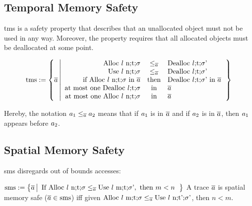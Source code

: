 \documentclass[utf8,acmsmall,review,screen,dvipsnames]{acmart}
\begin{document}
\subsection{Temporal Memory Safety}

\gls{tms} is a safety property that describes that an unallocated object must not be used in any way.
Moreover, the property requires that all allocated objects must be deallocated at some point.

\begin{definition}\label{def:trace:tmsdef}
  $$
  \tmssafe:=\left\{\trace \left| \begin{array}{rcl}
                              \ev{Alloc\ \loc\ n;\sandboxtag;\securitytag}&\le_{\trace}&\ev{Dealloc\ \loc;\sandboxtag;\securitytag'} \\
                              \ev{Use\ \loc\ n;\sandboxtag;\securitytag}&\le_{\trace}&\ev{Dealloc\ \loc;\sandboxtag;\securitytag'} \\
                              \text{if }\ev{Alloc\ \loc\ n;\sandboxtag;\securitytag}\text{ in }\trace&\text{then}&\ev{Dealloc\ \loc;\sandboxtag;\securitytag'}\text{ in }\trace \\
                              \text{at most one }\ev{Dealloc\ \loc;\sandboxtag;\securitytag}&\text{in}&\trace \\
                              \text{at most one }\ev{Alloc\ \loc\ n;\sandboxtag;\securitytag}&\text{in}&\trace \\
                            \end{array}\right.\right\}
  $$
\end{definition}
Hereby, the notation $\event[_{1}]\le_{\trace}\event[_{2}]$ means that if $\event[_{1}]$ is in $\trace$ and if $\event[_{2}]$ is in $\trace$, then $\event[_{1}]$ appears before $\event[_{2}]$.

\subsection{Spatial Memory Safety}

\gls{sms} disregards out of bounds accesses:

\begin{definition}\label{def:trace:smsdef}
  $
  \smssafe:=\left\{\trace \left|\begin{array}{rcl}
                                  \text{If }\ev{Alloc\ \loc\ n;\sandboxtag;\securitytag}\le_{\trace}\ev{Use\ \loc\ m;\sandboxtag;\securitytag'}, \text{ then }m<n
                                \end{array}\right.\right\}
  $
  A trace $\trace$ is spatial memory safe ($\trace\in\smssafe$) iff given $\ev{Alloc\ \loc\ m;\sandboxtag;\securitytag}\le_{\trace}\ev{Use\ \loc\ n;\sandboxtag';\securitytag'}$, then $n<m$.
\end{definition}
\end{document}
